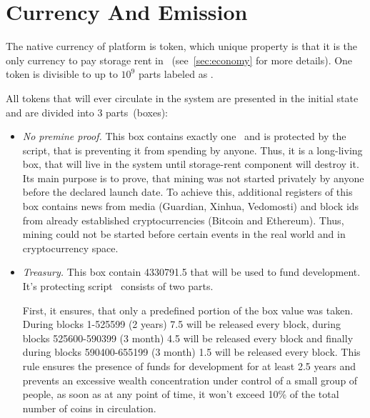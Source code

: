 \section{Currency And Emission}
\label{sec:currency}


The native currency of \Ergo{} platform is \Erg{} token, which unique property is
that it is the only currency to pay storage rent in \Ergo{}~(see~\ref{sec:economy} for more details).
One \Erg{} token is divisible to up to $10^9$ parts labeled as \nanoErg{}.

All \Erg{} tokens that will ever circulate in the system are presented in the
initial state and are divided into 3 parts~(boxes):

\begin{itemize}
    \item{\em No premine proof.} This box contains exactly one~\Erg{} and is protected by the script,
    that is preventing it from spending by anyone.
    Thus, it is a long-living box, that will live in the system until storage-rent component will
    destroy it.
    Its main purpose is to prove, that \Ergo{} mining was not started privately by anyone before
    the declared launch date.
    To achieve this, additional registers of this box contains news from media (Guardian, Xinhua, Vedomosti)
    and block ids from already established cryptocurrencies (Bitcoin and Ethereum).
    Thus, \Ergo{} mining could not be started before certain events in the real world and in
    cryptocurrency space.

    \item{\em Treasury.} This box contain 4330791.5 \Erg{} that will be used to fund \Ergo{}
    development.
    It's protecting script~\cite{link to corresponding ergo tree} consists of two parts.

    First, it ensures, that only a predefined portion of the box value was taken.
    During blocks 1-525599 (2 years) 7.5 \Erg{} will be released every block,
    during blocks 525600-590399 (3 month) 4.5 \Erg{} will be released every block and finally
    during blocks 590400-655199 (3 month) 1.5 \Erg{} will be released every block.
    This rule ensures the presence of funds for \Ergo{} development for at least 2.5 years and
    prevents an excessive wealth concentration under control of a small group of people, as soon
    as at any point of time, it won't exceed 10\% of the total number of coins in circulation.


\end{itemize}
